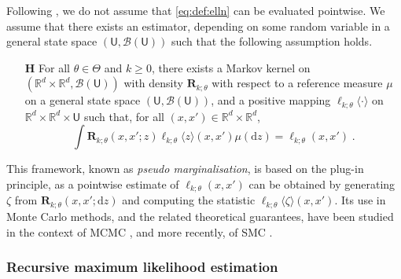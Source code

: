 \documentclass[12pt]{article}
\def\Xset{\mathbb{R}^d}
\newcommand{\parvec}{\theta}
\newcommand{\parspace}{\Theta}
\newcommand{\rmd}{\ensuremath{\mathrm{d}}}
\newcommand{\eqsp}{\;}
\newcounter{hypH}
\newenvironment{hypH}{\refstepcounter{hypH}\begin{itemize}
\item[{\bf H\arabic{hypH}}]}{\end{itemize}}
\newcommand{\marginalset}{\mathsf{U}}
\newcommand{\kernelmarg}{\mathbf{R}}
\newcommand{\qg}[1]{\ell_{#1}}
\newcommand{\hatqg}[1]{\mathsf{\ell}_{#1}}
\begin{document}
Following \cite{fearnhead2008particle, olsson2011particle, gloaguen2018online, gloaguen2021pseudo}, we do not assume that  \eqref{eq:def:elln} can be evaluated pointwise.
We assume that there exists an estimator, depending on some random variable in a general state space $(\marginalset,\mathcal{B}(\marginalset))$ such that the following assumption holds.
\begin{hypH} 
\label{assum:unbiased}
For all $\parvec \in\parspace$ and $k\geqslant 0$, there exists a Markov kernel on $(\Xset\times\Xset,\mathcal{B}(\marginalset))$ with density $\kernelmarg_{k;\parvec}$ with respect to a reference measure $\mu$ on a general state space $(\marginalset,\mathcal{B}(\marginalset))$,  and a positive mapping $\hatqg{k;\parvec}\langle \cdot\rangle$ on $\Xset\times\Xset\times\marginalset$ such that, for all $(x,x')\in\Xset \times \Xset$,
\begin{equation*}
\int \kernelmarg_{k;\parvec}(x,x';z)\hatqg{k;\parvec}\langle z\rangle(x,x')\mu(\rmd z) =  \qg{k;\parvec}(x,x')\eqsp.
\end{equation*}
\end{hypH}
This framework, known as \textit{pseudo marginalisation}, is based on the plug-in principle, as a pointwise estimate of $\qg{k;\parvec}(x,x')$ can be obtained by generating $\zeta$ from $\kernelmarg_{k;\parvec}(x,x';\rmd z)$ and computing the statistic $\hatqg{k;\parvec}\langle \zeta\rangle(x,x')$. 
Its use in Monte Carlo methods, and the related theoretical guarantees, have been studied in the context of MCMC \citep{andrieu2009pseudo}, and more recently, of SMC \citep{gloaguen2021pseudo}.

\subsubsection*{Recursive maximum likelihood estimation}
\end{document}
